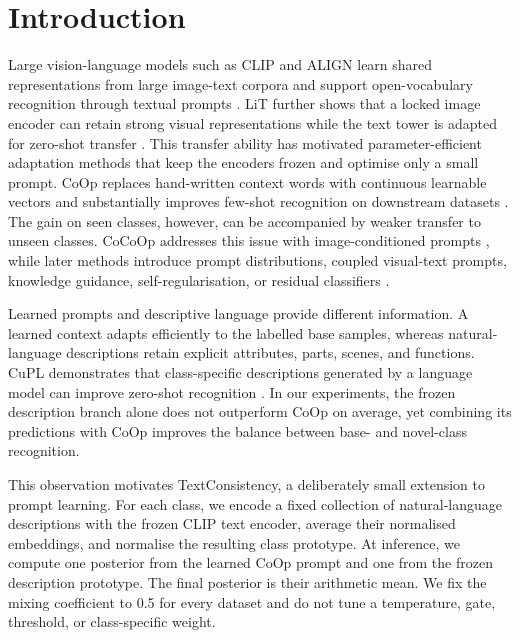 \documentclass[preprint,12pt]{elsarticle}
\begin{document}
\section{Introduction}
\label{sec:introduction}

Large vision-language models such as CLIP and ALIGN learn shared representations from large image-text corpora and support open-vocabulary recognition through textual prompts \cite{radford2021clip,jia2021align}. LiT further shows that a locked image encoder can retain strong visual representations while the text tower is adapted for zero-shot transfer \cite{zhai2022lit}. This transfer ability has motivated parameter-efficient adaptation methods that keep the encoders frozen and optimise only a small prompt. CoOp replaces hand-written context words with continuous learnable vectors and substantially improves few-shot recognition on downstream datasets \cite{zhou2022coop}. The gain on seen classes, however, can be accompanied by weaker transfer to unseen classes. CoCoOp addresses this issue with image-conditioned prompts \cite{zhou2022cocoop}, while later methods introduce prompt distributions, coupled visual-text prompts, knowledge guidance, self-regularisation, or residual classifiers \cite{lu2022proda,khattak2023maple,yao2023kgcoop,khattak2023promptsrc,yu2023taskres}.

Learned prompts and descriptive language provide different information. A learned context adapts efficiently to the labelled base samples, whereas natural-language descriptions retain explicit attributes, parts, scenes, and functions. CuPL demonstrates that class-specific descriptions generated by a language model can improve zero-shot recognition \cite{pratt2023cupl}. In our experiments, the frozen description branch alone does not outperform CoOp on average, yet combining its predictions with CoOp improves the balance between base- and novel-class recognition.

This observation motivates TextConsistency, a deliberately small extension to prompt learning. For each class, we encode a fixed collection of natural-language descriptions with the frozen CLIP text encoder, average their normalised embeddings, and normalise the resulting class prototype. At inference, we compute one posterior from the learned CoOp prompt and one from the frozen description prototype. The final posterior is their arithmetic mean. We fix the mixing coefficient to 0.5 for every dataset and do not tune a temperature, gate, threshold, or class-specific weight.
\end{document}
